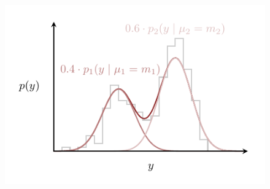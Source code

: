 \documentclass[
  letterpaper,
  DIV=11,
  numbers=noendperiod]{scrartcl}
\begin{document}
\begin{figure}
\begin{minipage}{0.45\linewidth}
{\captionsetup{labelsep=none}\includegraphics{figures/label_switching/config_one/config_one.pdf}

}

\subcaption{\label{fig-label-switching-1}}

\end{minipage}%
%
\begin{minipage}{0.45\linewidth}


\subcaption{\label{fig-label-switching-2}}

\end{minipage}%
%
\begin{minipage}{0.05\linewidth}
~\end{minipage}%


\end{figure}
\end{document}
